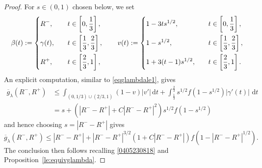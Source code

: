 \documentclass[10pt,a4paper]{amsart}
\newcommand\dt{{\,\mathrm{d}t}}
\newcommand{\ol}{\overline}
\begin{document}
\begin{proof}
For $s\in (0,1)$ chosen below, we set
\begin{equation*}
	\beta(t):=\begin{dcases}
		 R^-, \quad & t\in \left[0, \frac13\right],\\
		\gamma(t),\quad & t\in \left[\frac13, \frac23\right],\\
		 R^+, \quad & t\in \left[\frac23,1\right],
	\end{dcases} \qquad
	v(t):=\begin{dcases}
		1-3t s^{1/2}, \quad & t\in \left[0, \frac13\right],\\
		1- s^{1/2}, \quad & t\in \left[\frac13, \frac23\right],\\
		1 + 3 (t-1)  s^{1/2}, \quad & t\in \left[\frac23,1\right].
	\end{dcases}
\end{equation*}
An explicit computation, similar to \eqref{eqglambdale1}, gives
\[
\begin{split}
	\ol g_\lambda( R^-,  R^+)  & \leq \int_{(0,1/3)\cup(2/3,1)}(1-v) |v'| 
	\dt + \int_\frac13^\frac23 s^{1/2} f(1- s^{1/2}) |\gamma'(t)|\, \dt
	\\  
	& =
	s +(|R^--  R^+|+C|R^--  R^+|^2) s^{1/2} f(1-s^{1/2})
\end{split}
\]
and hence choosing $s=|R^--  R^+|$ gives
\begin{equation}\label{1902241215}
	\ol	g_\lambda( R^-,R^+) \leq  | R^- - R^+| +|R^--  R^+|^{3/2}(1+C|R^--  R^+|)  f(1-| R^- - R^+|^{1/2}) .
\end{equation}
The conclusion then follows recalling  
\eqref{0405230818}
and Proposition~\ref{le:equivglambda}.


\smallskip


\end{proof}
\end{document}
